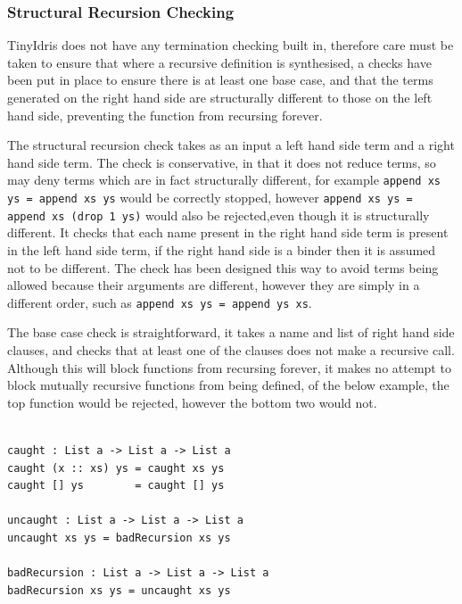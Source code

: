 \documentclass[a4paper]{article}
\begin{document}
\subsubsection{Structural Recursion Checking}
\label{sec:orgb4d20b2}
TinyIdris does not have any termination checking built in,
therefore care must be taken to ensure that where a recursive
definition is synthesised, a checks have been put in place to
ensure there is at least one base case, and that the terms
generated on the right hand side are structurally different to those
on the left hand side, preventing the function from recursing forever. 

The structural recursion check takes as an input a
left hand side term and a right hand side term. The check is
conservative, in that it does not reduce terms, so may deny terms
which are in fact structurally different, for example
\texttt{append xs ys = append xs ys} would be correctly stopped, however \texttt{append xs ys = append xs (drop 1 ys)} would also be rejected,even though it is structurally different. It checks that each name
present in the right hand side term is present in the left hand side
term, if the right hand side is a binder then it is assumed not to
be different. The check has been designed this way to avoid terms
being allowed because their arguments are different, however they
are simply in a different order, such as
\texttt{append xs ys = append ys xs}.  	

The base case check is straightforward, it takes a name and list of
right hand side clauses, and checks that at least one of the clauses
does not make a recursive call. Although this will block functions from
recursing forever, it makes no attempt to block mutually recursive
functions from being defined, of the below example, the top function
would be rejected, however the bottom two would not.

\begin{center}
  \begin{verbatim}

caught : List a -> List a -> List a
caught (x :: xs) ys = caught xs ys
caught [] ys        = caught [] ys

uncaught : List a -> List a -> List a
uncaught xs ys = badRecursion xs ys

badRecursion : List a -> List a -> List a
badRecursion xs ys = uncaught xs ys
    
  \end{verbatim}
\end{center}
\end{document}
